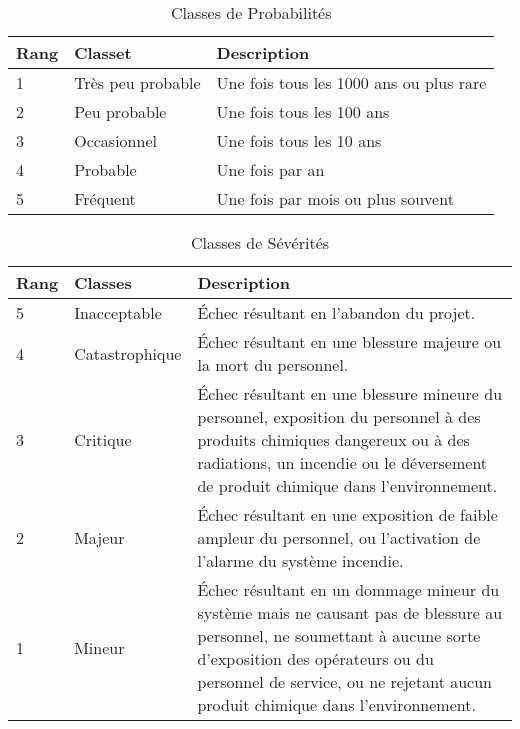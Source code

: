 \documentclass[12pt]{article}
\begin{document}
 
\begin{table}[H]
\centering
\caption{Classes de Probabilités}
\begin{tabular}{ p{2cm} p{3cm} p{8cm}}
\hline \bf Rang & \bf Classet & \bf Description \\
\hline 1 & Très peu probable & Une fois tous les 1000 ans ou plus rare \\
2 & Peu probable & Une fois tous les 100 ans \\
3 & Occasionnel & Une fois tous les 10 ans\\
4 & Probable & Une fois par an\\
5 & Fréquent & Une fois par mois ou plus souvent \\

\hline

\end{tabular}
\end{table}

 
\begin{table}[H]
\centering
\caption{Classes de Sévérités}
\begin{tabular}{ p{2cm} p{3cm} p{8cm}}
\hline \bf Rang & \bf Classes & \bf Description \\

\hline 5 & Inacceptable & Échec résultant en l’abandon du projet.\\
4 & Catastrophique & Échec résultant en une blessure majeure ou la mort du personnel. \\
3 & Critique & Échec résultant en une blessure mineure du personnel, exposition du personnel à des produits chimiques dangereux ou à des radiations, un incendie ou le déversement de produit chimique dans l’environnement. \\
2 & Majeur & Échec résultant en une exposition de faible ampleur du personnel, ou l’activation de l’alarme du système incendie.\\
1 & Mineur & Échec résultant en un dommage mineur du système mais ne causant pas de blessure au personnel, ne soumettant à aucune sorte d’exposition des opérateurs ou du personnel de service, ou ne rejetant aucun produit chimique dans l’environnement. \\
\hline
\end{tabular}
\end{table}

\end{document}
